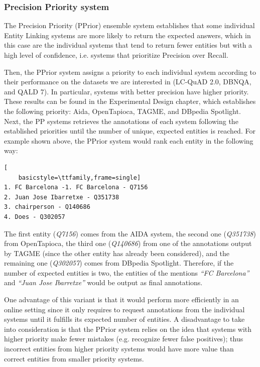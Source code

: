 \subsubsection{Precision Priority system}
The Precision Priority (PPrior) ensemble system establishes that some individual Entity 
Linking systems are more likely to return the expected answers, which in this case are the 
individual systems that tend to return fewer entities but with a high level of confidence, 
i.e. systems that prioritize Precision over Recall.

Then, the PPrior system assigns a priority to each individual system according to their 
performance on the datasets we are interested in (LC-QuAD 2.0, DBNQA, and QALD 7). In 
particular, systems with better precision have higher priority. These results can be found in 
the Experimental Design chapter, which establishes the following priority: Aida, OpenTapioca, 
TAGME, and DBpedia Spotlight. Next, the PP systems retrieves the annotations of each system 
following the established priorities until the number of unique, expected entities is reached. 
For example shown above, the PPrior system would rank each entity in the following way:

\begin{lstlisting}[
    basicstyle=\ttfamily,frame=single]
1. FC Barcelona -1. FC Barcelona - Q7156
2. Juan Jose Ibarretxe - Q351738
3. chairperson - Q140686
4. Does - Q302057     
\end{lstlisting}

The first entity (\textit{Q7156}) comes from the AIDA system, the second one (\textit{Q351738}) 
from OpenTapioca, the third one (\textit{Q140686}) from one of the annotations output by 
TAGME (since the other entity has already been considered), and the remaining one (\textit{Q302057}) 
comes from DBpedia Spotlight. Therefore, if the number of expected entities is two, the 
entities of the mentions \textit{“FC Barcelona”} and \textit{“Juan Jose Ibarretxe”} would be 
output as final annotations.

One advantage of this variant is that it would perform more efficiently in an online setting 
since it only requires to request annotations from the individual systems until it fulfills 
its expected number of entities. A disadvantage to take into consideration is that the PPrior 
system relies on the idea that systems with higher priority make fewer mistakes (e.g. 
recognize fewer false positives); thus incorrect entities from higher priority systems would 
have more value than correct entities from smaller priority systems.

